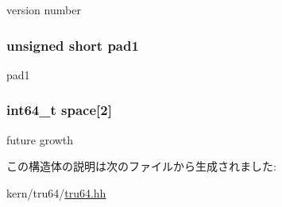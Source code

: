 version number \hypertarget{structTru64_1_1nxm__shared_ae142edeff5e8e134c7b06d379b189d61}{
\subsubsection[{pad1}]{\setlength{\rightskip}{0pt plus 5cm}unsigned short {\bf pad1}}}
\label{structTru64_1_1nxm__shared_ae142edeff5e8e134c7b06d379b189d61}


pad1 \hypertarget{structTru64_1_1nxm__shared_a752b57f2668491e9bdc2d0f3c8ac0862}{
\subsubsection[{space}]{\setlength{\rightskip}{0pt plus 5cm}int64\_\-t {\bf space}\mbox{[}2\mbox{]}}}
\label{structTru64_1_1nxm__shared_a752b57f2668491e9bdc2d0f3c8ac0862}


future growth 

この構造体の説明は次のファイルから生成されました:\begin{DoxyCompactItemize}
\item 
kern/tru64/\hyperlink{kern_2tru64_2tru64_8hh}{tru64.hh}\end{DoxyCompactItemize}
